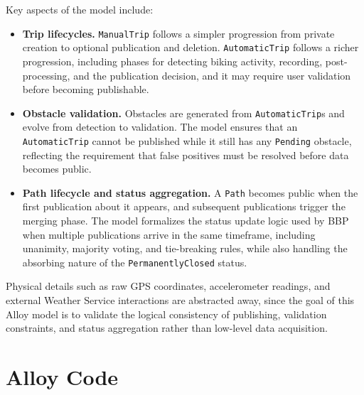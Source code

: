 \noindent
Key aspects of the model include:
\begin{itemize}
    \item \textbf{Trip lifecycles.} \texttt{ManualTrip} follows a simpler progression from private creation to optional publication and deletion. \texttt{AutomaticTrip} follows a richer progression, including phases for detecting biking activity, recording, post-processing, and the publication decision, and it may require user validation before becoming publishable.
    \item \textbf{Obstacle validation.} Obstacles are generated from \texttt{AutomaticTrip}s and evolve from detection to validation. The model ensures that an \texttt{AutomaticTrip} cannot be published while it still has any \texttt{Pending} obstacle, reflecting the requirement that false positives must be resolved before data becomes public.
    \item \textbf{Path lifecycle and status aggregation.} A \texttt{Path} becomes public when the first publication about it appears, and subsequent publications trigger the merging phase. The model formalizes the status update logic used by BBP when multiple publications arrive in the same timeframe, including unanimity, majority voting, and tie-breaking rules, while also handling the absorbing nature of the \texttt{PermanentlyClosed} status.
\end{itemize}

\noindent
Physical details such as raw GPS coordinates, accelerometer readings, and external Weather Service interactions are abstracted away, since the goal of this Alloy model is to validate the logical consistency of publishing, validation constraints, and status aggregation rather than low-level data acquisition.




\section{Alloy Code}
\label{sec:alloy_code}

